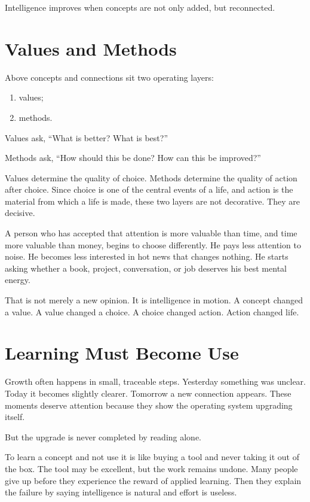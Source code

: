 Intelligence improves when concepts are not only added, but reconnected.

\section*{Values and Methods}

Above concepts and connections sit two operating layers:

\begin{enumerate}
\item values;
\item methods.
\end{enumerate}

Values ask, ``What is better? What is best?''

Methods ask, ``How should this be done? How can this be improved?''

Values determine the quality of choice. Methods determine the quality of action after choice. Since choice is one of the central events of a life, and action is the material from which a life is made, these two layers are not decorative. They are decisive.

A person who has accepted that attention is more valuable than time, and time more valuable than money, begins to choose differently. He pays less attention to noise. He becomes less interested in hot news that changes nothing. He starts asking whether a book, project, conversation, or job deserves his best mental energy.

That is not merely a new opinion. It is intelligence in motion. A concept changed a value. A value changed a choice. A choice changed action. Action changed life.

\section*{Learning Must Become Use}

Growth often happens in small, traceable steps. Yesterday something was unclear. Today it becomes slightly clearer. Tomorrow a new connection appears. These moments deserve attention because they show the operating system upgrading itself.

But the upgrade is never completed by reading alone.

To learn a concept and not use it is like buying a tool and never taking it out of the box. The tool may be excellent, but the work remains undone. Many people give up before they experience the reward of applied learning. Then they explain the failure by saying intelligence is natural and effort is useless.

